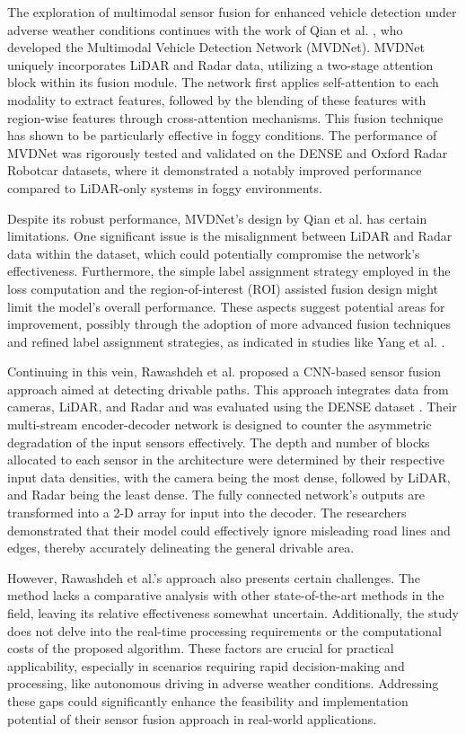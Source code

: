 \documentclass[report.tex]{subfiles}
\begin{document}
    The exploration of multimodal sensor fusion for enhanced vehicle detection under adverse weather conditions continues with the work of Qian et al. \cite{qian2021robust}, who developed the Multimodal Vehicle Detection Network (MVDNet). MVDNet uniquely incorporates LiDAR and Radar data, utilizing a two-stage attention block within its fusion module. The network first applies self-attention to each modality to extract features, followed by the blending of these features with region-wise features through cross-attention mechanisms. This fusion technique has shown to be particularly effective in foggy conditions. The performance of MVDNet was rigorously tested and validated on the DENSE \cite{bijelic2020seeing} and Oxford Radar Robotcar \cite{barnes2020oxford} datasets, where it demonstrated a notably improved performance compared to LiDAR-only systems in foggy environments.

    Despite its robust performance, MVDNet's design by Qian et al. \cite{qian2021robust} has certain limitations. One significant issue is the misalignment between LiDAR and Radar data within the dataset, which could potentially compromise the network's effectiveness. Furthermore, the simple label assignment strategy employed in the loss computation and the region-of-interest (ROI) assisted fusion design might limit the model's overall performance. These aspects suggest potential areas for improvement, possibly through the adoption of more advanced fusion techniques and refined label assignment strategies, as indicated in studies like Yang et al. \cite{yang2022ralibev}.

    Continuing in this vein, Rawashdeh et al. \cite{rawashdeh2021drivable} proposed a CNN-based sensor fusion approach aimed at detecting drivable paths. This approach integrates data from cameras, LiDAR, and Radar and was evaluated using the DENSE dataset \cite{bijelic2020seeing}. Their multi-stream encoder-decoder network is designed to counter the asymmetric degradation of the input sensors effectively. The depth and number of blocks allocated to each sensor in the architecture were determined by their respective input data densities, with the camera being the most dense, followed by LiDAR, and Radar being the least dense. The fully connected network's outputs are transformed into a 2-D array for input into the decoder. The researchers demonstrated that their model could effectively ignore misleading road lines and edges, thereby accurately delineating the general drivable area.

    However, Rawashdeh et al.'s approach \cite{rawashdeh2021drivable} also presents certain challenges. The method lacks a comparative analysis with other state-of-the-art methods in the field, leaving its relative effectiveness somewhat uncertain. Additionally, the study does not delve into the real-time processing requirements or the computational costs of the proposed algorithm. These factors are crucial for practical applicability, especially in scenarios requiring rapid decision-making and processing, like autonomous driving in adverse weather conditions. Addressing these gaps could significantly enhance the feasibility and implementation potential of their sensor fusion approach in real-world applications.
\end{document}
